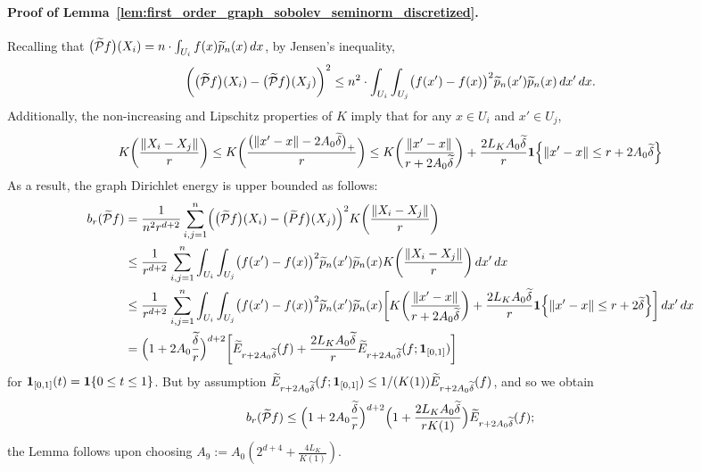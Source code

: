 \paragraph{Proof of Lemma~\ref{lem:first_order_graph_sobolev_seminorm_discretized}.}
Recalling that $\bigl(\widetilde{\mathcal{P}}f\bigr)(X_i) = n \cdot \int_{U_i} f(x) \widetilde{p}_n(x) \,dx$, by Jensen's inequality,
\begin{equation*}
\biggl(\bigl(\widetilde{\mathcal{P}}f\bigr)(X_i) - \bigl(\widetilde{\mathcal{P}}f\bigr)(X_j)\biggr)^2 \leq n^2 \cdot \int_{U_i} \int_{U_j} \bigl(f(x') - f(x)\bigr)^2 \widetilde{p}_n(x') \widetilde{p}_n(x) \,dx' \,dx.
\end{equation*}
Additionally, the non-increasing and Lipschitz properties of $K$ imply that for any $x \in U_i$ and $x' \in U_j$, 
\begin{equation*}
K\biggl(\frac{\|X_i - X_j\|}{r}\biggr) \leq K\biggl(\frac{\bigl(\|x' - x\| - 2A_0\widetilde{\delta}\bigr)_{+}}{r}\biggr) \leq K\biggl(\frac{\|x' - x\|}{r + 2A_0\widetilde{\delta}}\biggr) + \frac{2L_KA_0\widetilde{\delta}}{r}\mathbf{1}\Bigl\{\|x' - x\| \leq r + 2A_0\widetilde{\delta}\Bigr\}
\end{equation*}
As a result, the graph Dirichlet energy is upper bounded as follows:
\begin{align*}
b_r(\widetilde{\mathcal{P}}f) & = \frac{1}{n^2r^{d + 2}} \sum_{i,j = 1}^n \Bigl(\bigl(\widetilde{\mathcal{P}}f\bigr)(X_i) - \bigl(\widetilde{P}f\bigr)(X_j)\Bigr)^2 K\biggl(\frac{\|X_i - X_j\|}{r}\biggr) \\
& \leq \frac{1}{r^{d + 2}} \sum_{i,j = 1}^n \int_{U_i} \int_{U_j}  \bigl(f(x') - f(x)\bigr)^2 \widetilde{p}_n(x') \widetilde{p}_n(x) K\biggl(\frac{\|X_i - X_j\|}{r}\biggr) \,dx' \,dx \\
& \leq \frac{1}{r^{d + 2}} \sum_{i,j = 1}^n \int_{U_i} \int_{U_j}  \bigl(f(x') - f(x)\bigr)^2 \widetilde{p}_n(x') \widetilde{p}_n(x) \biggl[K\biggl(\frac{\|x' - x\|}{r + 2A_0\widetilde{\delta}}\biggr) + \frac{2L_KA_0\widetilde{\delta}}{r}\mathbf{1}\Bigl\{\|x' - x\| \leq r + 2\widetilde{\delta}\Bigr\}\biggr] \,dx' \,dx \\
& = \Bigl(1 + 2A_0\frac{\widetilde{\delta}}{r}\Bigr)^{d + 2}\biggl[\widetilde{E}_{r + 2A_0\widetilde{\delta}}(f) + \frac{2L_KA_0\widetilde{\delta}}{r}\widetilde{E}_{r + 2A_0\widetilde{\delta}}(f; \mathbf{1}_{[0,1]})\biggr]
\end{align*}
for $\mathbf{1}_{[0,1]}(t) = \mathbf{1}\{0 \leq t \leq 1\}$. But by assumption $\widetilde{E}_{r + 2A_0\widetilde{\delta}}(f; \mathbf{1}_{[0,1]}) \leq 1/(K(1))\widetilde{E}_{r + 2A_0\widetilde{\delta}}(f)$, and so we obtain
\begin{equation*}
b_r(\widetilde{\mathcal{P}}f) \leq \Bigl(1 + 2A_0\frac{\widetilde{\delta}}{r}\Bigr)^{d + 2} \Bigl(1 + \frac{2L_KA_0\widetilde{\delta}}{rK(1)}\Bigr) \widetilde{E}_{r + 2A_0\widetilde{\delta}}(f);
\end{equation*}
the Lemma follows upon choosing $A_9 := A_0(2^{d + 4} + \frac{4L_K}{K(1)})$.

